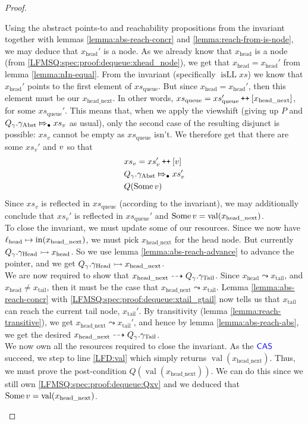 \documentclass[a4paper, 10pt]{report}
\theoremstyle{definition}
\newcommand{\xsc}{xs}
\newcommand{\xsqueue}{xs_{\mathrm{queue}}}
\newcommand{\isLL}{\operatorname{isLL}}
\newcommand{\locN}[1]{\loc_{\mathrm{#1}}}
\newcommand{\lochead}{\locN{head}}
\newcommand{\nIn}[1]{\operatorname{in}(#1)}
\newcommand{\nVal}[1]{\operatorname{val}(#1)}
\newcommand{\node}{x}
\newcommand{\nodeN}[1]{\node_{\mathrm{#1}}}
\newcommand{\nodehead}{\nodeN{head}}
\newcommand{\nodetail}{\nodeN{tail}}
\newcommand{\nodeheadnext}{\nodeN{head\_next}}
\newcommand{\absvalue}{\val}
\newcommand{\absvalueList}{xs_v}
\newcommand{\Qg}{Q_\gname}
\newcommand{\gabst}{\gname_{\mathrm{Abst}}}
\newcommand{\ghead}{\gname_{\mathrm{Head}}}
\newcommand{\gtail}{\gname_{\mathrm{Tail}}}
\newcommand\catenate{\mathbin{\text{\ttfamily\upshape ++}}}
\newcommand{\abstractstateauth}[2]{#1 \Mapsto_{\bullet} #2}
\newcommand{\reach}[2]{#1 \leadsto #2}
\newcommand{\ar}[2]{#1 \dashrightarrow #2}
\newcommand{\ap}[2]{#1 \rightarrowtail #2}
\begin{document}
\begin{proof}
\begin{itemize}
\begin{itemize}
      Using the abstract points-to and reachability propositions from the invariant together with lemmas \ref{lemma:abs-reach-concr} and \ref{lemma:reach-from-is-node}, we may deduce that $\nodehead'$ is a node. As we already know that $\nodehead$ is a node (from \ref{LFMSQ:spec:proof:dequeue:xhead_node}), we get that $\nodehead = \nodehead'$ from lemma \ref{lemma:nIn-equal}. From the invariant (specifically $\isLL \xsc$) we know that $\nodehead'$ points to the first element of $\xsqueue$. But since $\nodehead = \nodehead'$, then this element must be our $\nodeheadnext$. In other words, $\xsqueue = \xsqueue' \catenate [\nodeheadnext]$, for some $\xsqueue'$.
      This means that, when we apply the viewshift (giving up $P$ and $\abstractstateauth{\Qg.\gabst}{\absvalueList}$ as usual), only the second case of the resulting disjunct is possible: $\absvalueList$ cannot be empty as $\xsqueue$ isn't. We therefore get that there are some $\absvalueList'$ and $\absvalue$ so that
      \begin{align}
        &\absvalueList = \absvalueList' \catenate [\absvalue]\\
        &\abstractstateauth{\Qg.\gabst}{\absvalueList'}\\
        &Q(\Some \absvalue)\label{LFMSQ:spec:proof:dequeue:Qxv}
      \end{align}
      Since $\absvalueList$ is reflected in $\xsqueue$ (according to the invariant), we may additionally conclude that $\absvalueList'$ is reflected in $\xsqueue'$ and $\Some \absvalue = \nVal{\nodeheadnext}$.\\
      To close the invariant, we must update some of our resources. Since we now have $\lochead \mapsto \nIn{\nodeheadnext}$, we must pick $\nodeheadnext$ for the head node. But currently $\ap{\Qg.\ghead}{\nodehead}$. So we use lemma \ref{lemma:abs-reach-advance} to advance the pointer, and we get $\ap{\Qg.\ghead}{\nodeheadnext}$.\\
      We are now required to show that $\ar{\nodeheadnext}{\Qg.\gtail}$. Since $\reach{\nodehead}{\nodetail}$, and $\nodehead \neq \nodetail$, then it must be the case that $\reach{\nodeheadnext}{\nodetail}$. Lemma \ref{lemma:abs-reach-concr} with \ref{LFMSQ:spec:proof:dequeue:xtail_gtail} now tells us that $\nodetail$ can reach the current tail node, $\nodetail'$. By transitivity (lemma \ref{lemma:reach-transitive}), we get $\reach{\nodeheadnext}{\nodetail'}$, and hence by lemma \ref{lemma:abs-reach-abs}, we get the desired $\ar{\nodeheadnext}{\Qg.\gtail}$.\\
      We now own all the resources required to close the invariant. As the $\textsf{\color{blue} CAS}$ succeed, we step to line \ref{LFD:val} which simply returns $\nVal{\nodeheadnext}$. Thus, we must prove the post-condition $Q(\nVal{\nodeheadnext})$. We can do this since we still own \ref{LFMSQ:spec:proof:dequeue:Qxv} and we deduced that $\Some \absvalue = \nVal{\nodeheadnext}$.
    \end{itemize}


\end{itemize}
\end{proof}
\end{document}
